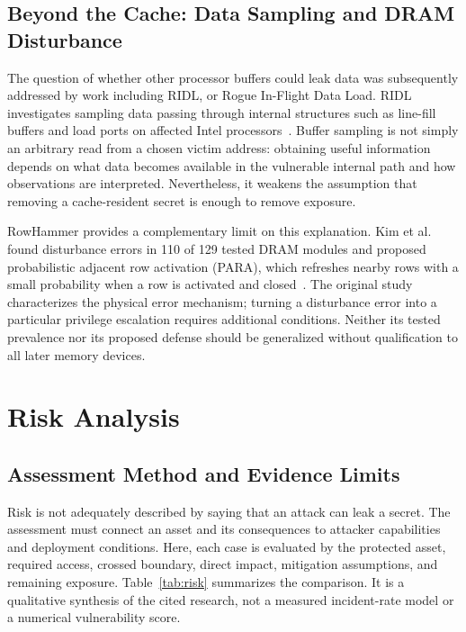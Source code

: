 \documentclass[man,12pt,apacite,nofontenc,nolmodern,floatsintext]{apa6}
\begin{document}
\subsection{Beyond the Cache: Data Sampling and DRAM Disturbance}
The question of whether other processor buffers could leak data was subsequently addressed by work including RIDL, or Rogue In-Flight Data Load. RIDL investigates sampling data passing through internal structures such as line-fill buffers and load ports on affected Intel processors~\cite{ridl2019}. Buffer sampling is not simply an arbitrary read from a chosen victim address: obtaining useful information depends on what data becomes available in the vulnerable internal path and how observations are interpreted. Nevertheless, it weakens the assumption that removing a cache-resident secret is enough to remove exposure.

RowHammer provides a complementary limit on this explanation. Kim et al. found disturbance errors in 110 of 129 tested DRAM modules and proposed probabilistic adjacent row activation (PARA), which refreshes nearby rows with a small probability when a row is activated and closed~\cite{kim2014}. The original study characterizes the physical error mechanism; turning a disturbance error into a particular privilege escalation requires additional conditions. Neither its tested prevalence nor its proposed defense should be generalized without qualification to all later memory devices.

\section{Risk Analysis}
\subsection{Assessment Method and Evidence Limits}
Risk is not adequately described by saying that an attack can leak a secret. The assessment must connect an asset and its consequences to attacker capabilities and deployment conditions. Here, each case is evaluated by the protected asset, required access, crossed boundary, direct impact, mitigation assumptions, and remaining exposure. Table~\ref{tab:risk} summarizes the comparison. It is a qualitative synthesis of the cited research, not a measured incident-rate model or a numerical vulnerability score.
\end{document}
